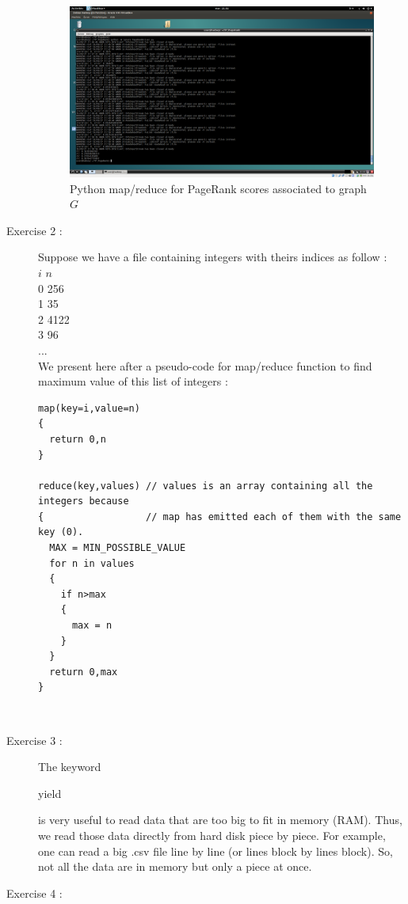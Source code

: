 \documentclass[pdftex,a4paper,DIV15]{scrartcl}
\begin{document}
\begin{description}
\begin{figure}[H]
\begin{center}
\includegraphics[scale=0.2]{images/mapreduce.png}
\end{center}
\caption{Python map/reduce for PageRank scores associated to graph $G$}
\label{mapreduce}
\end{figure}

\clearpage

\item[Exercise 2 :] Suppose we have a file containing integers with theirs indices as follow :\\

$i$ $n$\\
0 256 \\
1 35\\
2 4122\\
3 96\\
...\\

We present here after a pseudo-code for map/reduce function to find maximum value of this list of integers :\\

\begin{verbatim}
map(key=i,value=n)
{
  return 0,n
}

reduce(key,values) // values is an array containing all the integers because 
{                  // map has emitted each of them with the same key (0).
  MAX = MIN_POSSIBLE_VALUE
  for n in values
  {
    if n>max
    {
      max = n
    }
  }
  return 0,max
}
\end{verbatim}
\\
\item[Exercise 3 :] 

The keyword \begin{itshape}yield\end{itshape} is very useful to read data that are too big to fit in memory (RAM). Thus, we read those data directly from hard disk piece by piece.
For example, one can read a big .csv file line by line (or lines block by lines block). So, not all the data are in memory but only a piece at once. 
\item[Exercise 4 :] 

\end{description}
\end{document}
